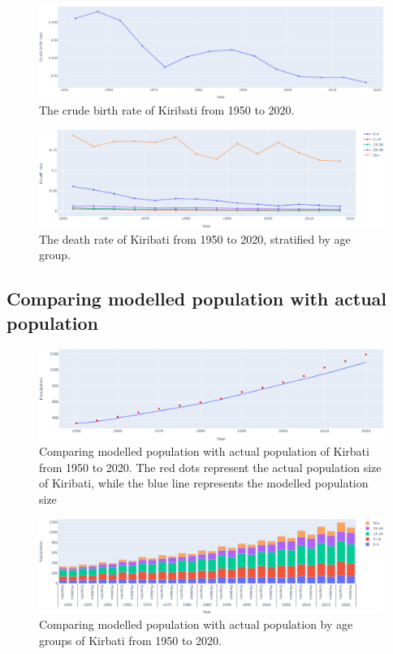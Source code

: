 \documentclass{article}
\begin{document}
\begin{figure}[!htp]
   \includegraphics[width=\textwidth,keepaspectratio]{images/cbr.png}
    \caption{The crude birth rate of Kiribati from 1950 to 2020.}
    \label{fig:cbr}
\end{figure}

\begin{figure}[!htp]
   \centerline{\includegraphics[width=\textwidth,keepaspectratio]{images/cdr.png}}
    \caption{The death rate of Kiribati from 1950 to 2020, stratified by age group.}
    \label{fig:cdr}
\end{figure}

\subsection{Comparing modelled population with actual population}
\begin{figure}[!htp]
    \centerline{\includegraphics[width=\textwidth,keepaspectratio]{images/modelled_total.png}}
    \caption{Comparing modelled population with actual population of Kirbati from 1950 to 2020. The red dots represent the actual population size of Kiribati,
     while the blue line represents the modelled population size}
    \label{fig:modelled_total}
\end{figure}

\begin{figure}[htp]
    \centerline{\includegraphics[width=\textwidth,keepaspectratio]{images/compare_pop.png}}
    \caption{Comparing modelled population with actual population by age groups of Kirbati from 1950 to 2020.}
    \label{fig:compare_group}
\end{figure}

\newpage    
\printbibliography
\end{document}
